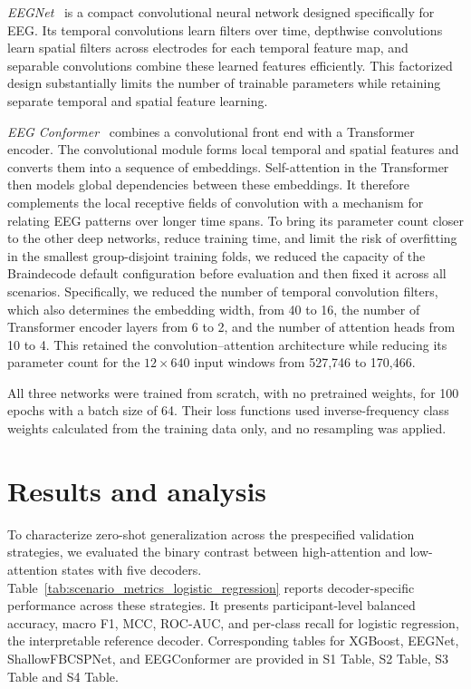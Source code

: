 \documentclass[10pt,letterpaper]{article}
\newcommand{\rev}[1]{#1}
\begin{document}
\rev{\textit{EEGNet}~\cite{lawhern2018eegnet} is a compact convolutional neural
network designed specifically for EEG. Its temporal convolutions learn filters
over time, depthwise convolutions learn spatial filters across electrodes for
each temporal feature map, and separable convolutions combine these learned
features efficiently. This factorized design substantially limits the number
of trainable parameters while retaining separate temporal and spatial feature
learning.}

\rev{\textit{EEG Conformer}~\cite{song2023conformer} combines a convolutional
front end with a Transformer encoder. The convolutional module forms local
temporal and spatial features and converts them into a sequence of embeddings.
Self-attention in the Transformer then models global dependencies between these
embeddings. It therefore complements the local receptive fields of convolution
with a mechanism for relating EEG patterns over longer time spans. To bring its
parameter count closer to the other deep networks, reduce training time, and
limit the risk of overfitting in the smallest group-disjoint training folds, we
reduced the capacity of the Braindecode default configuration before evaluation
and then fixed it across all scenarios. Specifically, we reduced the number of
temporal convolution filters, which also determines the embedding width, from
40 to 16, the number of Transformer encoder layers from 6 to 2, and the number
of attention heads from 10 to 4. This retained the convolution--attention
architecture while reducing its parameter count for the $12 \times 640$ input
windows from 527,746 to 170,466.}

\rev{All three networks were trained from scratch, with no pretrained weights,
for 100 epochs with a batch size of 64. Their loss functions used
inverse-frequency class weights calculated from the training data only, and no
resampling was applied.}

\section*{Results and analysis}

To characterize zero-shot generalization across the prespecified validation
strategies, we evaluated the binary contrast between high-attention and
low-attention states with five decoders.
Table~\ref{tab:scenario_metrics_logistic_regression} reports decoder-specific
performance across these strategies. It presents
participant-level balanced accuracy, macro F1, MCC, ROC-AUC, and per-class
recall for logistic regression, the interpretable reference decoder.
Corresponding tables for XGBoost, EEGNet, ShallowFBCSPNet, and EEGConformer are
provided in S1 Table, S2 Table, S3 Table and S4 Table.
\end{document}
